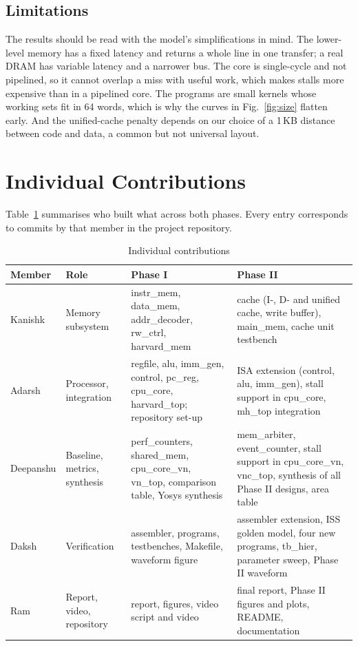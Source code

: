 \documentclass[conference]{IEEEtran}
\newcommand{\MemA}{Kanishk}     %
\newcommand{\MemB}{Adarsh}      %
\newcommand{\MemC}{Deepanshu}   %
\newcommand{\MemD}{Daksh}       %
\newcommand{\MemE}{Ram}         %
\begin{document}
\subsection{Limitations}
The results should be read with the model's simplifications in mind. The
lower-level memory has a fixed latency and returns a whole line in one
transfer; a real DRAM has variable latency and a narrower bus. The core is
single-cycle and not pipelined, so it cannot overlap a miss with useful
work, which makes stalls more expensive than in a pipelined core. The
programs are small kernels whose working sets fit in 64 words, which is why
the curves in Fig.~\ref{fig:size} flatten early. And the unified-cache
penalty depends on our choice of a 1\,KB distance between code and data, a
common but not universal layout.

\section{Individual Contributions}

Table~\ref{tab:contrib} summarises who built what across both phases. Every
entry corresponds to commits by that member in the project repository.

\begin{table}[t]
\caption{Individual contributions}
\label{tab:contrib}
\centering
\small
\setlength{\tabcolsep}{4pt}
\begin{tabularx}{\textwidth}{@{}>{\raggedright\arraybackslash}p{}>{\raggedright\arraybackslash}p{}>{\raggedright\arraybackslash}X>{\raggedright\arraybackslash}X@{}}
\toprule
Member & Role & Phase I & Phase II \\
\midrule
\MemA & Memory subsystem & instr\_mem, data\_mem, addr\_decoder, rw\_ctrl, harvard\_mem & cache (I-, D- and unified cache, write buffer), main\_mem, cache unit testbench \\
\MemB & Processor, integration & regfile, alu, imm\_gen, control, pc\_reg, cpu\_core, harvard\_top; repository set-up & ISA extension (control, alu, imm\_gen), stall support in cpu\_core, mh\_top integration \\
\MemC & Baseline, metrics, synthesis & perf\_counters, shared\_mem, cpu\_core\_vn, vn\_top, comparison table, Yosys synthesis & mem\_arbiter, event\_counter, stall support in cpu\_core\_vn, vnc\_top, synthesis of all Phase II designs, area table \\
\MemD & Verification & assembler, programs, testbenches, Makefile, waveform figure & assembler extension, ISS golden model, four new programs, tb\_hier, parameter sweep, Phase II waveform \\
\MemE & Report, video, repository & report, figures, video script and video & final report, Phase II figures and plots, README, documentation \\
\bottomrule
\end{tabularx}
\end{table}
\end{document}
